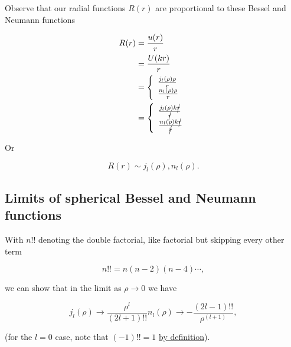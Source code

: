 Observe that our radial functions $R(r)$ are proportional to these Bessel and Neumann functions

\begin{align*}
R(r)
&= \frac{u(r)}{r}  \\
&= \frac{U(kr)}{r}  \\
&=
\left\{
\begin{array}{l}
\frac{j_l(\rho) \rho}{r} \\
\frac{n_l(\rho) \rho}{r}
\end{array}
\right. \\
&=
\left\{
\begin{array}{l}
\frac{j_l(\rho) k \cancel{r}}{\cancel{r}} \\
\frac{n_l(\rho) k \cancel{r}}{\cancel{r}}
\end{array}
\right.
\end{align*}

Or

\begin{equation}\label{eqn:qmTwoL23:360}
R(r) \sim j_l(\rho), n_l(\rho).
\end{equation}

\subsection{Limits of spherical Bessel and Neumann functions}

With $n!!$ denoting the double factorial, like factorial but skipping every other term

\begin{equation}\label{eqn:qmTwoL23:400}
n!! = n(n-2)(n-4) \cdots,
\end{equation}

we can show that in the limit as $\rho \rightarrow 0$ we have

\begin{subequations}
\label{eqn:qmTwoL23:380}
\begin{equation}\label{eqn:qmTwoL23:380a}
j_l(\rho) \rightarrow \frac{\rho^l}{(2 l + 1)!!} 
\end{equation}
\begin{equation}\label{eqn:qmTwoL23:380b}
n_l(\rho) \rightarrow -\frac{(2 l - 1)!!}{\rho^{(l+1)}},
\end{equation}
\end{subequations}

(for the $l=0$ case, note that $(-1)!! = 1$ \href{http://mathworld.wolfram.com/DoubleFactorial.html}{by definition}).

